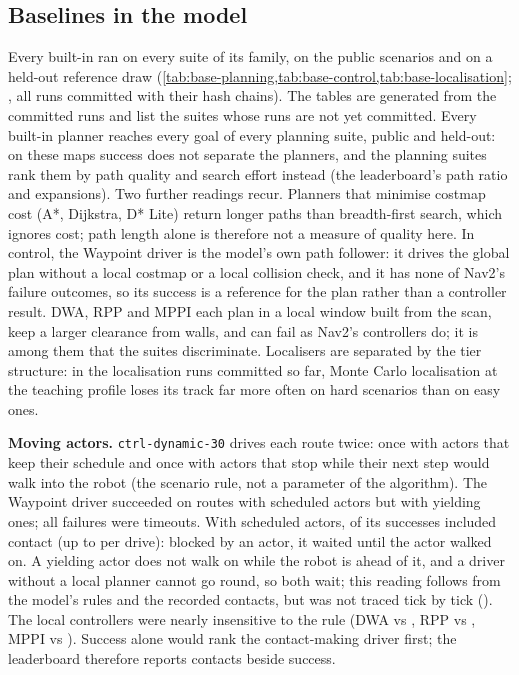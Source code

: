 
\subsection{Baselines in the model}\label{sec:exp-baselines}
Every built-in ran on every suite of its family, on the public scenarios and on a held-out
reference draw (\cref{tab:base-planning,tab:base-control,tab:base-localisation}; ,
all runs committed with their hash chains). The tables are generated from the committed runs and
list the suites whose runs are not yet committed. Every built-in planner reaches every goal of
every planning suite, public and held-out: on these maps success does not separate the planners,
and the planning suites rank them by path quality and search effort instead (the leaderboard's
path ratio and expansions). Two further readings recur. Planners that minimise
costmap cost (A*, Dijkstra, D* Lite) return longer paths than breadth-first search, which ignores
cost; path length alone is therefore not a measure of quality here. In control, the Waypoint driver is
the model's own path follower: it drives the global plan without a local costmap or a local
collision check, and it has none of Nav2's failure outcomes, so its success is a reference for the
plan rather than a controller result. DWA, RPP and MPPI each plan in a local window built from the
scan, keep a larger clearance from walls, and can fail as Nav2's controllers do; it is among them
that the suites discriminate. Localisers are separated
by the tier structure: in the localisation runs committed so far, Monte Carlo localisation at the
teaching profile loses its track far more often on hard scenarios than on easy ones.

\textbf{Moving actors.} \texttt{ctrl-dynamic-30} drives each route twice: once with actors that
keep their schedule and once with actors that stop while their next step would walk into the
robot (the scenario rule, not a parameter of the algorithm). The Waypoint driver succeeded on
\DynWaypointWalk{} routes with scheduled actors but \DynWaypointYield{} with yielding ones; all
\DynWaypointYieldTimeouts{} failures were timeouts. With scheduled actors, \DynWaypointWalkContactWins{}
of its successes included contact (up to \DynWaypointWalkMaxContacts{} per drive): blocked by an
actor, it waited until the actor walked on. A yielding actor does not walk on while the robot is
ahead of it, and a driver without a local planner cannot go round, so both wait; this reading
follows from the model's rules and the recorded contacts, but was not traced tick by tick
(). The local controllers were nearly insensitive to the rule (DWA
\DynDwaWalk{} vs \DynDwaYield{}, RPP \DynRppWalk{} vs \DynRppYield{}, MPPI \DynMppiWalk{} vs
\DynMppiYield{}). Success alone would rank the contact-making driver first; the leaderboard
therefore reports contacts beside success.

